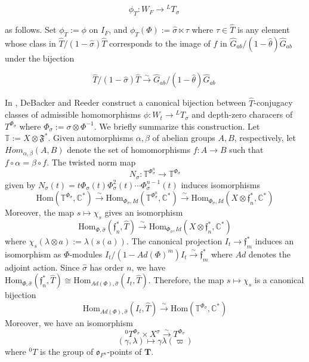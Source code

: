 \documentclass[11pt]{amsart}
\theoremstyle{plain}
\begin{document}
\begin{equation}
\phi_T : W_F \rightarrow {}^L T_{\sigma} \ \label{phiT}
\end{equation}

\noindent as follows.  Set $\phi_T := \phi$ on $I_F$, and $\phi_T(\Phi) := \hat{\sigma} \ltimes \tau$ where $\tau \in \hat{T}$ is any element whose class in $\hat{T} / (1 - \hat{\sigma}) \hat{T}$ corresponds to the image of $f$ in $\hat{G}_{ab} / (1 - \hat{\theta}) \hat{G}_{ab}$ under the bijection

\begin{equation}
\hat{T} / (1 - \hat{\sigma}) \hat{T} \stackrel{\sim}{\rightarrow} \hat{G}_{ab} / (1 - \hat{\theta}) \hat{G}_{ab} \ \label{bijectionfortau}
\end{equation}

In \cite[Chapter 4]{debackerreeder}, DeBacker and Reeder construct a canonical bijection between $\hat{T}$-conjugacy classes of admissible homomorphisms $\phi : W_t \rightarrow {}^L T_{\sigma}$ and depth-zero characers of $T^{\Phi_{\sigma}}$ where $\Phi_{\sigma} := \sigma \otimes \Phi^{-1}$.  We briefly summarize this construction. Let $\mathbb{T} := X \otimes \mathfrak{F}^*$.  Given automorphisms $\alpha, \beta$ of abelian groups $A,B$, respectively, let $Hom_{\alpha, \beta}(A,B)$ denote the set of homomorphisms $f : A \rightarrow B$ such that $f \circ \alpha = \beta \circ f$.  The twisted norm map $$N_{\sigma} : \mathbb{T}^{\Phi_{\sigma}^n} \rightarrow \mathbb{T}^{\Phi_{\sigma}}$$ given by $N_{\sigma}(t) = t \Phi_{\sigma}(t) \Phi_{\sigma}^2(t) \cdots \Phi_{\sigma}^{n-1}(t)$ induces isomorphisms $$\mathrm{Hom}(\mathbb{T}^{\Phi_{\sigma}}, \mathbb{C}^*) \stackrel{\sim}{\rightarrow}  \mathrm{Hom}_{\Phi_{\sigma}, Id}(\mathbb{T}^{\Phi_{\sigma}^n}, \mathbb{C}^*) \stackrel{\sim}{\rightarrow} \mathrm{Hom}_{\Phi_{\sigma}, Id}(X \otimes \mathfrak{f}_n^*, \mathbb{C}^*)$$
Moreover, the map $s \mapsto \chi_s$ gives an isomorphism $$\mathrm{Hom}_{\Phi, \hat{\sigma}}(\mathfrak{f}_n^*, \hat{T}) \stackrel{\sim}{\rightarrow} \mathrm{Hom}_{\Phi_{\sigma}, Id}(X \otimes \mathfrak{f}_n^*, \mathbb{C}^*)$$ where $\chi_s(\lambda \otimes a) := \lambda(s(a))$.  The canonical projection $I_t \rightarrow \mathfrak{f}_m^*$ induces an isomorphism as $\Phi$-modules $I_t / (1 - Ad (\Phi)^m)I_t \stackrel{\sim}{\rightarrow} \mathfrak{f}_m^*$ where $Ad$ denotes the adjoint action.  Since $\hat{\sigma}$ has order $n$, we have $\mathrm{Hom}_{\Phi, \hat{\sigma}}(\mathfrak{f}_n^*, \hat{T}) \cong \mathrm{Hom}_{Ad(\Phi), \hat{\sigma}}(I_t, \hat{T})$.  Therefore, the map $s \mapsto \chi_s$ is a canonical bijection $$\mathrm{Hom}_{Ad(\Phi), \hat{\sigma}}(I_t, \hat{T}) \stackrel{\sim}{\rightarrow} \mathrm{Hom}(\mathbb{T}^{\Phi_{\sigma}}, \mathbb{C}^*)$$
Moreover, we have an isomorphism $${}^0 T^{\Phi_{\sigma}} \times X^{\sigma} \stackrel{\sim}{\rightarrow} T^{\Phi_{\sigma}}$$ $$(\gamma, \lambda) \mapsto \gamma \lambda(\varpi)$$ where ${}^0 T$ is the group of $\mathfrak{o}_{F^u}$-points of $\mathbf{T}$.
\end{document}
